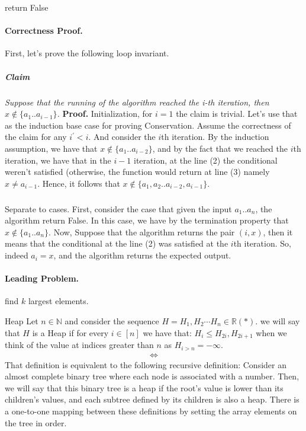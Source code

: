 \begin{algorithm}[H]
  { 
    } 
    return False 
\end{algorithm}

\paragraph{Correctness Proof.} First, let's prove the following loop invariant. 
\subparagraph{Claim} \textit{Suppose that the running of the algorithm reached the i-th iteration, then $x \notin \{ a_{1} .. a_{i-1} \}$.} 
\textbf{Proof.} Initialization, for $i=1$ the claim is trivial. Let's use that as the induction base case for proving Conservation. Assume the correctness of the claim for any $i^{\prime} < i$. And consider the $i$th iteration. By the induction assumption, we have that $x \notin \{a_1 .. a_{i-2} \} $, and by the fact that we reached the $i$th iteration, we have that in the $i-1$ iteration, at the line (2) the conditional weren't satisfied (otherwise, the function would return at line (3) namely $x \neq a_{i-1}$. Hence, it follows that $ x \notin \{ a_1, a_2 .. a_{i-2}, a_{i-1} \} $.     
  \subparagraph{} Separate to cases. First, consider the case that given the input $a_1 .. a_n$, the algorithm return False. In this case, we have by the termination property that $x \notin \{ a_1 .. a_n \} $. Now, Suppose that the algorithm returns the pair $\left( i, x \right)$, then it means that the conditional at the line (2) was satisfied at the $i$th iteration. So, indeed $a_{i} = x$, and the algorithm returns the expected output.        


  \newpage


  \paragraph{Leading Problem.} find $k$ largest elements.  
\begin{defbox}{Heap}
  Let $n \in \mathbb{N}$ and consider the sequence $H = H_{1}, H_{2} \cdots H_{n} \in \mathbb{R} \left( * \right)$. we will say that $H$ is a Heap if for every $i \in [n]$ we have that: $H_{i} \le H_{2i}, H_{2i + 1}$ when we think of the value at indices greater than $n$ as $H_{i>n} = -\infty$. 
  \begin{equation*}
    \begin{split}
      \Leftrightarrow
    \end{split}
  \end{equation*} 
That definition is equivalent to the following recursive definition: Consider an almost complete binary tree where each node is associated with a number. Then, we will say that this binary tree is a heap if the root's value is lower than its children's values, and each subtree defined by its children is also a heap. There is a one-to-one mapping between these definitions by setting the array elements on the tree in order.
\end{defbox}

